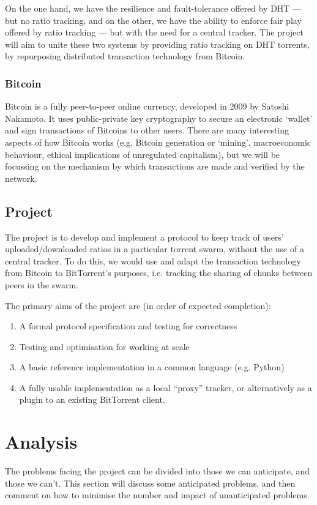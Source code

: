 \documentclass{article}
\begin{document}
On the one hand, we have the resilience and fault-tolerance offered by DHT --- but no ratio tracking, and on the other, we have the ability to enforce fair play offered by ratio tracking --- but with the need for a central tracker.  The project will aim to unite these two systems by providing ratio tracking on DHT torrents, by repurposing distributed transaction technology from Bitcoin.

\subsubsection{Bitcoin}
Bitcoin is a fully peer-to-peer online currency, developed in 2009 by Satoshi Nakamoto.  It uses public-private key cryptography to secure an electronic `wallet' and sign transactions of Bitcoins to other users.  There are many interesting aspects of how Bitcoin works (e.g. Bitcoin generation or `mining', macroeconomic behaviour, ethical implications of unregulated capitalism), but we will be focussing on the mechanism by which transactions are made and verified by the network.

\subsection{Project}

The project is to develop and implement a protocol to keep track of users' uploaded/downloaded ratios in a particular torrent swarm, without the use of a central tracker.  To do this, we would use and adapt the transaction technology from Bitcoin to BitTorrent's purposes, i.e. tracking the sharing of chunks between peers in the swarm.


The primary aims of the project are (in order of expected completion):
\begin{enumerate}
\item A formal protocol specification and testing for correctness
\item Testing and optimisation for working at scale
\item A basic reference implementation in a common language (e.g. Python)
\item A fully usable implementation as a local ``proxy'' tracker, or alternatively as a plugin to an existing BitTorrent client.
\end{enumerate}

\section{Analysis}
The problems facing the project can be divided into those we can anticipate, and those we can't.  This section will discuss some anticipated problems, and then comment on how to minimise the number and impact of unanticipated problems.
\end{document}

